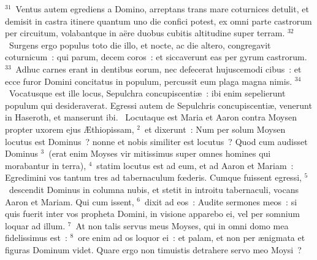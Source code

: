 ${}^{31}$~Ventus autem egrediens a Domino, arreptans trans mare coturnices detulit, et demisit in castra itinere quantum uno die confici potest, ex omni parte castrorum per circuitum, volabantque in a\"ere duobus cubitis altitudine super terram.
${}^{32}$~Surgens ergo populus toto die illo, et nocte, ac die altero, congregavit coturnicum~: qui parum, decem coros~: et siccaverunt eas per gyrum castrorum.
${}^{33}$~Adhuc carnes erant in dentibus eorum, nec defecerat hujuscemodi cibus~: et ecce furor Domini concitatus in populum, percussit eum plaga magna nimis.
${}^{34}$~Vocatusque est ille locus, Sepulchra concupiscenti\ae~: ibi enim sepelierunt populum qui desideraverat. Egressi autem de Sepulchris concupiscenti\ae , venerunt in Haseroth, et manserunt ibi.
~\lettrine[lines=10,image=true,loversize=0.05,lraise=-0.03]{L}{}ocutaque est Maria et Aaron contra Moysen propter uxorem ejus \AE thiopissam,
${}^{2}$~et dixerunt~: Num per solum Moysen locutus est Dominus~? nonne et nobis similiter est locutus~? Quod cum audisset Dominus
${}^{3}$~(erat enim Moyses vir mitissimus super omnes homines qui morabantur in terra),
${}^{4}$~statim locutus est ad eum, et ad Aaron et Mariam~: Egredimini vos tantum tres ad tabernaculum fœderis. Cumque fuissent egressi,
${}^{5}$~descendit Dominus in columna nubis, et stetit in introitu tabernaculi, vocans Aaron et Mariam. Qui cum issent,
${}^{6}$~dixit ad eos~: Audite sermones meos~: si quis fuerit inter vos propheta Domini, in visione apparebo ei, vel per somnium loquar ad illum.
${}^{7}$~At non talis servus meus Moyses, qui in omni domo mea fidelissimus est~:
${}^{8}$~ore enim ad os loquor ei~: et palam, et non per \ae nigmata et figuras Dominum videt. Quare ergo non timuistis detrahere servo meo Moysi~?


